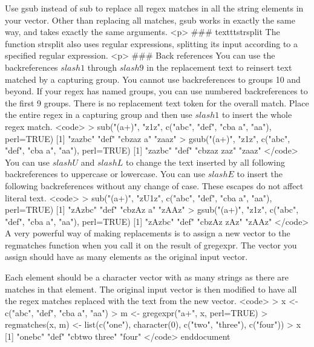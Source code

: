 Use gsub instead of sub to replace all regex matches in all the string elements in your vector. Other than replacing all matches, gsub works in exactly the same way, and takes exactly the same arguments.
<p>
### {texttt{strsplit}}
The function strsplit also uses regular expressions, splitting its input according to a specified regular expression.
<p>
### {Back references}
You can use the backreferences $slash 1$ through $slash 9$ in the replacement text to reinsert text matched by a capturing group. You cannot use backreferences to groups 10 and beyond. If your regex has named groups, you can use numbered backreferences to the first 9 groups. There is no replacement text token for the overall match. Place the entire regex in a capturing group and then use $slash 1$ to insert the whole regex match.
<code>
> sub("(a+)", "z1z", c("abc", "def", "cba a", "aa"), perl=TRUE)
[1] "zazbc"  "def"  "cbzaz a"   "zaaz"   
> gsub("(a+)", "z1z", c("abc", "def", "cba a", "aa"), perl=TRUE)
[1] "zazbc"  "def"  "cbzaz zaz" "zaaz"
</code>
You can use $slash U$ and $slash L$ to change the text inserted by all following backreferences to uppercase or lowercase. You can use $slash E$ to insert the following backreferences without any change of case. These escapes do not affect literal text.
<code>
> sub("(a+)", "zU1z", c("abc", "def", "cba a", "aa"), perl=TRUE)
[1] "zAzbc"  "def"  "cbzAz a"   "zAAz"   
> gsub("(a+)", "z1z", c("abc", "def", "cba a", "aa"), perl=TRUE)
[1] "zAzbc"  "def"  "cbzAz zAz" "zAAz"
</code>
A very powerful way of making replacements is to assign a new vector to the regmatches function when you call it on the result of gregexpr. The vector you assign should have as many elements as the original input vector. 

Each element should be a character vector with as many strings as there are matches in that element. The original input vector is then modified to have all the regex matches replaced with the text from the new vector.
<code>
> x <- c("abc", "def", "cba a", "aa")
> m <- gregexpr("a+", x, perl=TRUE)
> regmatches(x, m) <- list(c("one"), character(0), c("two", "three"), c("four"))
> x
[1]  "onebc"       "def"         "cbtwo three" "four"
</code>
end{document}

